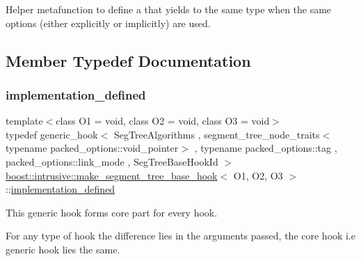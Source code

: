 Helper metafunction to define a { that} yields to the same type when the same options (either explicitly or implicitly) are used. 

\subsection{Member Typedef Documentation}
\mbox{\label{classboost_1_1intrusive_1_1make__segment__tree__base__hook_ac9e2687ae1be3fafd1465686917f339b}} 
\subsubsection{\texorpdfstring{implementation\+\_\+defined}{implementation\_defined}}
{\footnotesize\ttfamily template$<$class O1 = void, class O2 = void, class O3 = void$>$ \\
typedef generic\+\_\+hook$<$ Seg\+Tree\+Algorithms , segment\+\_\+tree\+\_\+node\+\_\+traits$<$typename packed\+\_\+options\+::void\+\_\+pointer$>$ , typename packed\+\_\+options\+::tag , packed\+\_\+options\+::link\+\_\+mode , Seg\+Tree\+Base\+Hook\+Id $>$ \hyperlink{classboost_1_1intrusive_1_1make__segment__tree__base__hook}{boost\+::intrusive\+::make\+\_\+segment\+\_\+tree\+\_\+base\+\_\+hook}$<$ O1, O2, O3 $>$\+::\hyperlink{classboost_1_1intrusive_1_1make__segment__tree__base__hook_ac9e2687ae1be3fafd1465686917f339b}{implementation\+\_\+defined}}


\begin{DoxyItemize}
\item This generic hook forms core part for every hook.  
\item For any type of hook the difference lies in the arguments passed, the core hook i.\+e generic hook lies the same. 
\end{DoxyItemize}\mbox{\label{classboost_1_1intrusive_1_1make__segment__tree__base__hook_a98fb49751f922d9d2bd29b788fae7de6}} 
